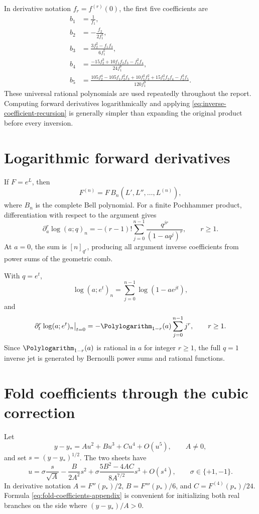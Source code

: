 \documentclass[11pt,letterpaper,oneside,openany]{book}
\theoremstyle{definition}
\theoremstyle{remark}
\begin{document}
In derivative notation \(f_r=f^{(r)}(0)\), the first five coefficients are
\begin{align*}
 b_1&=\frac1{f_1},\\
 b_2&=-\frac{f_2}{2f_1^3},\\
 b_3&=\frac{3f_2^2-f_1f_3}{6f_1^5},\\
 b_4&=\frac{-15f_2^3+10f_1f_2f_3-f_1^2f_4}{24f_1^7},\\
 b_5&=\frac{105f_2^4-105f_1f_2^2f_3+10f_1^2f_3^2
 +15f_1^2f_2f_4-f_1^3f_5}{120f_1^9}.
\end{align*}
These universal rational polynomials are used repeatedly throughout the
report.  Computing forward derivatives logarithmically and applying
\eqref{eq:inverse-coefficient-recursion} is generally simpler than expanding
the original product before every inversion.

\section{Logarithmic forward derivatives}
If \(F=e^L\), then
\[
 F^{(n)}=F\,B_n(L',L'',\ldots,L^{(n)}),
\]
where \(B_n\) is the complete Bell polynomial.  For a finite Pochhammer
product, differentiation with respect to the argument gives
\begin{equation}\label{eq:qpoch-log-a-derivatives}
 \partial_a^r\log(a;q)_n
 =-(r-1)!\sum_{j=0}^{n-1}
 \frac{q^{jr}}{(1-aq^j)^r},
 \qquad r\ge1.
\end{equation}
At \(a=0\), the sum is \([n]_{q^r}\), producing all argument inverse
coefficients from power sums of the geometric comb.

With \(q=e^t\),
\[
 \log(a;e^t)_n=\sum_{j=0}^{n-1}\log(1-ae^{jt}),
\]
and
\begin{equation}\label{eq:qpoch-log-t-derivatives}
 \partial_t^r\log(a;e^t)_n\big|_{t=0}
 =-\Polylogarithm_{1-r}(a)\sum_{j=0}^{n-1}j^r,
 \qquad r\ge1.
\end{equation}
Since \(\Polylogarithm_{1-r}(a)\) is rational in \(a\) for integer \(r\ge1\), the full
\(q=1\) inverse jet is generated by Bernoulli power sums and rational
functions.

\section{Fold coefficients through the cubic correction}
Let
\[
 y-y_*=A u^2+B u^3+C u^4+O(u^5),
 \qquad A\ne0,
\]
and set \(s=(y-y_*)^{1/2}\).  The two sheets have
\begin{equation}\label{eq:fold-coefficients-appendix}
 u=\sigma\frac{s}{\sqrt A}
 -\frac{B}{2A^2}s^2
 +\sigma\frac{5B^2-4AC}{8A^{7/2}}s^3
 +O(s^4),
 \qquad \sigma\in\{+1,-1\}.
\end{equation}
In derivative notation
\(A=F''(p_*)/2\), \(B=F'''(p_*)/6\), and
\(C=F^{(4)}(p_*)/24\).  Formula
\eqref{eq:fold-coefficients-appendix} is convenient for initializing both real
branches on the side where \((y-y_*)/A>0\).
\end{document}
